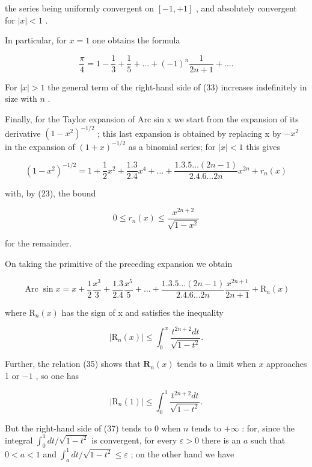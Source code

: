 the series being uniformly convergent on \([-1,+1]\) , and absolutely convergent for \(|x|<1\) .

In particular, for \(x = 1\) one obtains the formula

\[
{\frac {\pi}{4}} = 1 - {\frac {1}{3}} + {\frac {1}{5}} + \dots + (- 1) ^ {n} {\frac {1}{2 n + 1}} + \dots .\tag{34}
\]

For \(|x| > 1\) the general term of the right-hand side of (33) increases indefinitely in size with \(n\) .

Finally, for the Taylor expansion of Arc sin x we start from the expansion of its derivative \((1 - x^{2})^{-1/2}\) ; this last expansion is obtained by replacing x by \(-x^{2}\) in the expansion of \((1 + x)^{-1/2}\) as a binomial series; for \(|x| < 1\) this gives

\[
(1 - x ^ {2}) ^ {- 1 / 2} = 1 + \frac {1}{2} x ^ {2} + \frac {1 . 3}{2 . 4} x ^ {4} + \dots + \frac {1 . 3 . 5 \dots (2 n - 1)}{2 . 4 . 6 \dots 2 n} x ^ {2 n} + r _ {n} (x)
\]

with, by (23), the bound

\[
0 \leqslant r _ {n} (x) \leqslant \frac {x ^ {2 n + 2}}{\sqrt {1 - x ^ {2}}}
\]

for the remainder.

On taking the primitive of the preceding expansion we obtain

\[
\operatorname{Arc} \sin x = x + \frac {1}{2} \frac {x ^ {3}}{3} + \frac {1 . 3}{2 . 4} \frac {x ^ {5}}{5} + \dots + \frac {1 . 3 . 5 \dots (2 n - 1)}{2 . 4 . 6 \dots 2 n} \frac {x ^ {2 n + 1}}{2 n + 1} + \mathrm{R} _ {n} (x)\tag{35}
\]

where \(\mathrm{R}_{n}(x)\) has the sign of x and satisfies the inequality

\[
| \mathrm{R} _ {n} (x) | \leqslant \int_ {0} ^ {x} \frac {t ^ {2 n + 2} d t}{\sqrt {1 - t ^ {2}}}.\tag{36}
\]

Further, the relation (35) shows that \(\mathbf{R}_n(x)\) tends to a limit when \(x\) approaches 1 or \(-1\) , so one has

\[
| \mathrm{R} _ {n} (1) | \leqslant \int_ {0} ^ {1} \frac {t ^ {2 n + 2} d t}{\sqrt {1 - t ^ {2}}}.\tag{37}
\]

But the right-hand side of (37) tends to 0 when \(n\) tends to \(+\infty\) : for, since the integral \(\int_0^1 dt / \sqrt{1 - t^2}\) is convergent, for every \(\varepsilon > 0\) there is an \(a\) such that \(0 < a < 1\) and \(\int_a^1 dt / \sqrt{1 - t^2} \leqslant \varepsilon\) ; on the other hand we have

